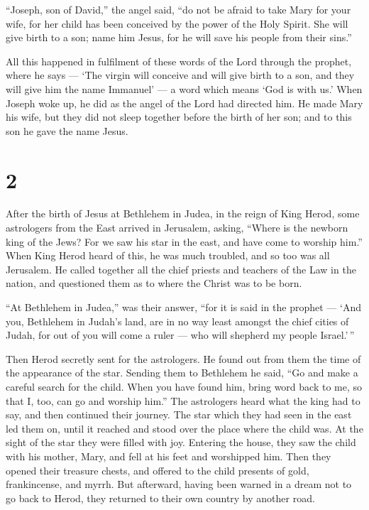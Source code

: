``Joseph, son of David,'' the angel said, ``do not be afraid to take
Mary for your wife, for her child has been conceived by the power of the
Holy Spirit.  She will give birth to a son; name him Jesus,
for he will save his people from their sins.''

 All this happened in fulfilment of these words of the Lord
through the prophet, where he says ---  `The virgin will
conceive and will give birth to a son, and they will give him the name
Immanuel' --- a word which means `God is with us.'  When
Joseph woke up, he did as the angel of the Lord had directed him.
 He made Mary his wife, but they did not sleep together
before the birth of her son; and to this son he gave the name Jesus.

\hypertarget{section-1}{%
\section{2}\label{section-1}}

 After the birth of Jesus at Bethlehem in Judea, in the
reign of King Herod, some astrologers from the East arrived in
Jerusalem, asking,  ``Where is the newborn king of the Jews?
For we saw his star in the east, and have come to worship him.''
 When King Herod heard of this, he was much troubled, and so
too was all Jerusalem.  He called together all the chief
priests and teachers of the Law in the nation, and questioned them as to
where the Christ was to be born.

 ``At Bethlehem in Judea,'' was their answer, ``for it is
said in the prophet ---  `And you, Bethlehem in Judah's
land, are in no way least amongst the chief cities of Judah, for out of
you will come a ruler --- who will shepherd my people Israel.'\,''

 Then Herod secretly sent for the astrologers. He found out
from them the time of the appearance of the star.  Sending
them to Bethlehem he said, ``Go and make a careful search for the child.
When you have found him, bring word back to me, so that I, too, can go
and worship him.''  The astrologers heard what the king had
to say, and then continued their journey. The star which they had seen
in the east led them on, until it reached and stood over the place where
the child was.  At the sight of the star they were filled
with joy.  Entering the house, they saw the child with his
mother, Mary, and fell at his feet and worshipped him. Then they opened
their treasure chests, and offered to the child presents of gold,
frankincense, and myrrh.  But afterward, having been warned
in a dream not to go back to Herod, they returned to their own country
by another road.

